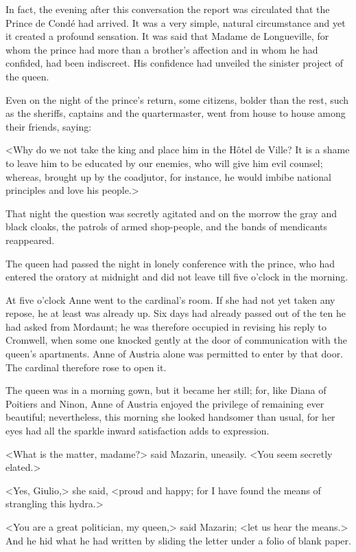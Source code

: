 In fact, the evening after this conversation the report was circulated that the Prince de Condé had arrived. It was a very simple, natural circumstance and yet it created a profound sensation. It was said that Madame de Longueville, for whom the prince had more than a brother's affection and in whom he had confided, had been indiscreet. His confidence had unveiled the sinister project of the queen.

Even on the night of the prince's return, some citizens, bolder than the rest, such as the sheriffs, captains and the quartermaster, went from house to house among their friends, saying:

<Why do we not take the king and place him in the Hôtel de Ville? It is a shame to leave him to be educated by our enemies, who will give him evil counsel; whereas, brought up by the coadjutor, for instance, he would imbibe national principles and love his people.>

That night the question was secretly agitated and on the morrow the gray and black cloaks, the patrols of armed shop-people, and the bands of mendicants reappeared.

The queen had passed the night in lonely conference with the prince, who had entered the oratory at midnight and did not leave till five o'clock in the morning.

At five o'clock Anne went to the cardinal's room. If she had not yet taken any repose, he at least was already up. Six days had already passed out of the ten he had asked from Mordaunt; he was therefore occupied in revising his reply to Cromwell, when some one knocked gently at the door of communication with the queen's apartments. Anne of Austria alone was permitted to enter by that door. The cardinal therefore rose to open it.

The queen was in a morning gown, but it became her still; for, like Diana of Poitiers and Ninon, Anne of Austria enjoyed the privilege of remaining ever beautiful; nevertheless, this morning she looked handsomer than usual, for her eyes had all the sparkle inward satisfaction adds to expression.

<What is the matter, madame?> said Mazarin, uneasily. <You seem secretly elated.>

<Yes, Giulio,> she said, <proud and happy; for I have found the means of strangling this hydra.>

<You are a great politician, my queen,> said Mazarin; <let us hear the means.> And he hid what he had written by sliding the letter under a folio of blank paper.

